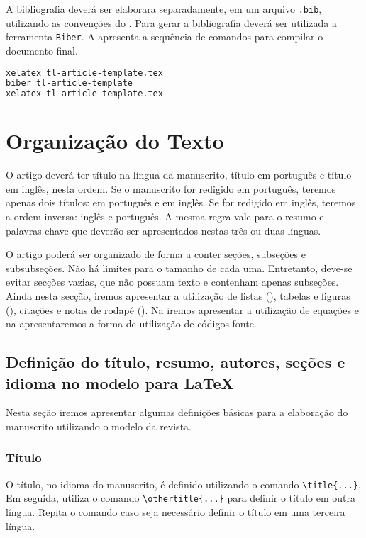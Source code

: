 \documentclass{textolivre}
\begin{document}
A bibliografia deverá ser elaborara separadamente, em um arquivo \texttt{.bib}, utilizando as 
convenções do . Para gerar a bibliografia deverá ser utilizada a ferramenta \texttt{Biber}.
A  apresenta a sequência de comandos para compilar o documento final.
\begin{lstlisting}[language=bash, label=lst-compiledocument, caption={Sequência para gerar o documento final.}]
xelatex tl-article-template.tex 
biber tl-article-template 
xelatex tl-article-template.tex
\end{lstlisting} %

\section{Organização do Texto}\label{sec-organizacao}
O artigo deverá ter título na língua da manuscrito, título em português e título em inglês, nesta ordem.
Se o manuscrito for redigido em português, teremos apenas dois títulos: em português e em inglês.
Se for redigido em inglês, teremos a ordem inversa: inglês e português.
A mesma regra vale para o resumo e palavras-chave que deverão ser apresentados nestas três ou duas línguas.

O artigo poderá ser organizado de forma a conter seções, subseções e subsubseções. 
Não há limites para o tamanho de cada uma. Entretanto, deve-se evitar secções vazias, que não possuam texto e contenham apenas subseções. 
Ainda nesta secção, iremos apresentar a utilização de listas (), 
tabelas e figuras (), citações e notas de rodapé (). 
Na  iremos apresentar a utilização de equações e na 
apresentaremos a forma de utilização de códigos fonte.

\lipsum[5]

\subsection{Definição do título, resumo, autores, seções e idioma no modelo para \LaTeX{}}\label{sec-organizacao-latex}
Nesta seção iremos apresentar algumas definições básicas para a elaboração do manuscrito utilizando 
o modelo da revista.

\subsubsection{Título}\label{sec-titulo}
O título, no idioma do manuscrito, é definido utilizando o comando \verb|\title{...}|. Em seguida, 
utiliza o comando \verb|\othertitle{...}| para definir o título em outra língua. Repita o comando
caso seja necessário definir o título em uma terceira língua.
\end{document}
